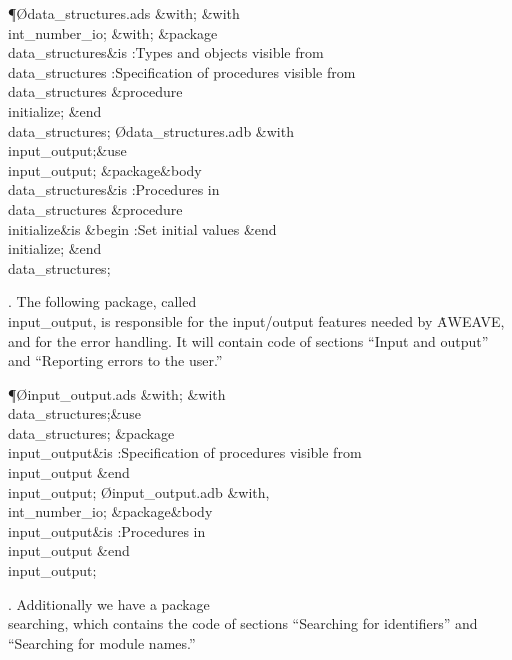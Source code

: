 \Y\P\O{data\_structures.ads}\?\6
\?\&{with}\8;\6
\&{with}\8\\{int\_number\_io};\6
\&{with}\8;\6
\&{package}\8\1\\{data\_structures}\2\8\&{is}\8\1\6
:Types and objects visible from \\{data\_structures}\X\6
:Specification of procedures visible from \\{data\_structures}\X\6
\&{procedure}\8\1\\{initialize}\2;\2\6
\&{end}\8\\{data\_structures};\7
\O{data\_structures.adb}\?\6
\?\&{with}\8\\{input\_output};\8\&{use}\8\\{input\_output};\6
\&{package}\8\1\&{body}\8\\{data\_structures}\2\8\&{is}\8\1\6
:Procedures in \\{data\_structures}\X\6
\&{procedure}\8\1\\{initialize}\2\8\&{is}\8\1\6
\4\&{begin}\6
:Set initial values\X\2\6
\&{end}\8\\{initialize};\2\6
\&{end}\8\\{data\_structures};\par
\fi

\*. The following package, called \\{input\_output}, is responsible for the
input/output features needed by \.{AWEAVE}, and for the error handling.
It will contain code of sections ``Input and output'' and ``Reporting
errors to the user.''

\Y\P\O{input\_output.ads}\?\6
\?\&{with}\8;\6
\&{with}\8\\{data\_structures};\8\&{use}\8\\{data\_structures};\6
\&{package}\8\1\\{input\_output}\2\8\&{is}\8\1\6
:Specification of procedures visible from \\{input\_output}\X\2\6
\&{end}\8\\{input\_output};\7
\O{input\_output.adb}\?\6
\?\&{with}\8\?,\?\\{int\_number\_io};\6
\&{package}\8\1\&{body}\8\\{input\_output}\2\8\&{is}\8\1\6
:Procedures in \\{input\_output}\X\2\6
\&{end}\8\\{input\_output};\par
\fi

\*. Additionally we have a package \\{searching}, which contains the code of
sections ``Searching for identifiers'' and ``Searching for module names.''

